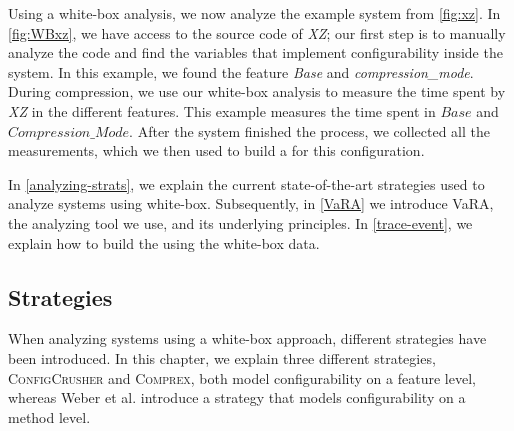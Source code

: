 Using a white-box analysis, we now analyze the example system from \autoref{fig:xz}. 
In \autoref{fig:WBxz}, we have access to the source code of \textit{XZ}; 
our first step is to manually analyze the code and find the variables that implement configurability inside the system. 
In this example, we found the feature \textit{Base} and \textit{compression\_mode}. 
During compression, we use our white-box analysis to measure the time spent by \textit{XZ} in the different features. 
This example measures the time spent in $Base$ and $Compression\_Mode$. 
After the system finished the process, we collected all the measurements, which we then used to build a {\perfInfluenceModel} for this configuration.

In \autoref{analyzing-strats}, we explain the current state-of-the-art strategies used to analyze systems using white-box. 
Subsequently, in \autoref{VaRA} we introduce VaRA, the analyzing tool we use, and its underlying principles. 
In \autoref{trace-event}, we explain how to build the {\perfInfluenceModel} using the white-box data.

\subsection{Strategies}\label{analyzing-strats}
When analyzing systems using a white-box approach, different strategies have been introduced. 
In this chapter, we explain three different strategies, \textsc{ConfigCrusher} and \textsc{Comprex}, 
both model configurability on a feature level, whereas Weber et al. introduce a strategy that models configurability on a method level.

